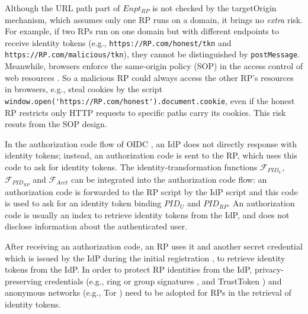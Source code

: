 Although the URL path part of $Enpt_{RP}$ %
 is not checked by the targetOrigin mechanism,
  which assumes only one RP runs on a domain,
   it brings no \emph{extra} risk.
For example, if two RPs run on one domain but with different endpoints to receive identity tokens
        (e.g., \verb+https://RP.com/honest/tkn+ and \verb+https://RP.com/malicious/tkn+),
         they cannot be distinguished by \verb+postMessage+.
Meanwhile, browsers enforce
 the same-origin policy (SOP) in the access control of web resources \cite{sop}.
So
    a malicious RP could always access the other RP's resources in browsers,
        e.g., steal cookies
        by the script
        \verb+window.open('https://RP.com/honest').document.cookie+,
    even if the honest RP restricts only HTTP requests to specific paths carry its cookies.
This risk resuts from the SOP design.


\vspace{0.4mm}
In the authorization code flow of OIDC \cite{OpenIDConnect},
    an IdP does not directly response with identity tokens;
        instead,
            an authorization code is sent to the RP,
            which uses this code to ask for identity tokens.
The identity-transformation functions $\mathcal{F}_{PID_{U}}$, $\mathcal{F}_{PID_{RP}}$ and $\mathcal{F}_{Acct}$
    can be integrated into the authorization code flow:
            an authorization code is forwarded to the RP script by the IdP script
                and this code is used to ask for an identity token binding $PID_U$ and $PID_{RP}$.
An authorization code is usually an index to retrieve identity tokens from the IdP,
        and does not disclose information about the authenticated user.


After receiving an authorization code, an RP uses it and another secret credential
         which is issued by the IdP during the initial registration \cite{OpenIDConnect},
     to retrieve identity tokens from the IdP.
In order to protect RP identities from the IdP,
        privacy-preserving credentials (e.g., ring or group signatures \cite{ring-sig,chaum1991group}, and TrustToken \cite{trusttoken})
        and anonymous networks (e.g., Tor \cite{tor}) need to be adopted for RPs in the retrieval of identity tokens.






